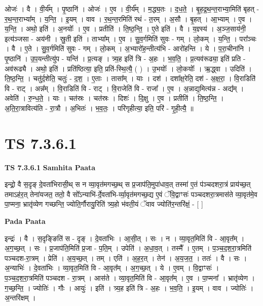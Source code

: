 \documentclass[17pt]{extarticle}
\begin{document}
ओजः॑ । वै । वी॒र्य᳚म् । पृ॒ष्ठानि॑ । ओजः॑ । ए॒व । वी॒र्य᳚म् । म॒द्ध्य॒तः । द॒ध॒ते॒ । बृ॒ह॒द्र॒थ॒न्त॒राभ्या॒मिति॑ बृहत् - र॒थ॒न्त॒राभ्या᳚म् । य॒न्ति॒ । इ॒यम् । वाव । र॒थ॒न्त॒रमिति॑ रथं - त॒रम् । अ॒सौ । बृ॒हत् । आ॒भ्याम् । ए॒व । य॒न्ति॒ । अथो॒ इति॑ । अ॒नयोः᳚ । ए॒व । प्रतीति॑ । ति॒ष्ठ॒न्ति॒ । ए॒ते इति॑ । वै । य॒ज्ञ्स्य॑ । अ॒ञ्ज॒साय॑नी॒ इत्य॑ञ्जसा - अय॑नी । स्रु॒ती इति॑ । ताभ्या᳚म् । ए॒व । सु॒व॒र्गमिति॑ सुवः - गम् । लो॒कम् । य॒न्ति॒ । परा᳚ञ्चः । वै । ए॒ते । सु॒व॒र्गमिति॑ सुवः - गम् । लो॒कम् । अ॒भ्यारो॑ह॒न्तीत्य॑भि - आरो॑हन्ति । ये । प॒रा॒चीना॑नि । पृ॒ष्ठानि॑ । उ॒प॒यन्तीत्यु॑प - यन्ति॑ । प्र॒त्यङ् । त्र्य॒ह इति॑ त्रि - अ॒हः । भ॒व॒ति॒ । प्र॒त्यव॑रूढ्या॒ इति॑ प्रति - अव॑रूढ्यै । अथो॒ इति॑ । प्रति॑ष्ठित्या॒ इति॒ प्रति॑-स्थि॒त्यै॒ ( ) । उ॒भयोः᳚ । लो॒कयोः᳚ । ऋ॒द्ध्वा । उदिति॑ । ति॒ष्ठ॒न्ति॒ । चतु॑र्द॒शेति॒ चतुः॑ - द॒श॒ । ए॒ताः । तासा᳚म् । याः । दश॑ । दशा᳚क्ष॒रेति॒ दश॑ - अ॒क्ष॒रा॒ । वि॒राडिति॑ वि - राट् । अन्न᳚म् । वि॒राडिति॑ वि - राट् । वि॒राजेति॑ वि - राजा᳚ । ए॒व । अ॒न्नाद्य॒मित्य॑न्न - अद्य᳚म् । अवेति॑ । रु॒न्ध॒ते॒ । याः । चत॑स्रः । चत॑स्रः । दिशः॑ । दि॒क्षु । ए॒व । प्रतीति॑ । ति॒ष्ठ॒न्ति॒ । अ॒ति॒रा॒त्रावित्य॑ति - रा॒त्रौ । अ॒भितः॑ । भ॒व॒तः॒ । परि॑गृहीत्या॒ इति॒ परि॑ - गृ॒ही॒त्यै॒ ॥  \newline




\section*{ TS 7.3.6.1 }

\textbf{TS 7.3.6.1 } \newline
\textbf{Samhita Paata} \newline

इन्द्रो॒ वै स॒दृङ् दे॒वता॑भिरासी॒थ् स न व्या॒वृत॑मगच्छ॒थ् स प्र॒जाप॑ति॒मुपा॑धाव॒त् तस्मा॑ ए॒तं प॑ञ्चदशरा॒त्रं प्राय॑च्छ॒त् तमाऽह॑र॒त् तेना॑यजत॒ ततो॒ वै सो᳚ऽन्याभि॑-र्दे॒वता॑भि-र्व्या॒वृत॑मगच्छ॒द्य ए॒वं ॅवि॒द्वाꣳसः॑ पञ्चदशरा॒त्रमास॑ते व्या॒वृत॑मे॒व पा॒प्मना॒ भ्रातृ॑व्येण गच्छन्ति॒ ज्योति॒र्गौरायु॒रिति॑ त्र्य॒हो भ॑वती॒यं ॅवाव ज्योति॑र॒न्तरि॑क्षं॒ - [  ] \newline

\textbf{Pada Paata} \newline

इन्द्रः॑ । वै । स॒दृङ्ङिति॑ स - दृङ् । दे॒वता॑भिः । आ॒सी॒त् । सः । न । व्या॒वृत॒मिति॑ वि - आ॒वृत᳚म् । अ॒ग॒च्छ॒त् । सः । प्र॒जाप॑ति॒मिति॑ प्र॒जा - प॒ति॒म् । उपेति॑ । अ॒धा॒व॒त् । तस्मै᳚ । ए॒तम् । प॒ञ्च॒द॒श॒रा॒त्रमिति॑ पञ्चदश-रा॒त्रम् । प्रेति॑ । अ॒य॒च्छ॒त् । तम् । एति॑ । अ॒ह॒र॒त् । तेन॑ । अ॒य॒ज॒त॒ । ततः॑ । वै । सः । अ॒न्याभिः॑ । दे॒वता॑भिः । व्या॒वृत॒मिति॑ वि - आ॒वृत᳚म् । अ॒ग॒च्छ॒त् । ये । ए॒वम् । वि॒द्वाꣳसः॑ । प॒ञ्च॒द॒श॒रा॒त्रमिति॑ पञ्चदश - रा॒त्रम् । आस॑ते । व्या॒वृत॒मिति॑ वि - आ॒वृत᳚म् । ए॒व । पा॒प्मना᳚ । भ्रातृ॑व्येण । ग॒च्छ॒न्ति॒ । ज्योतिः॑ । गौः । आयुः॑ । इति॑ । त्र्य॒ह इति॑ त्रि - अ॒हः । भ॒व॒ति॒ । इ॒यम् । वाव । ज्योतिः॑ । अ॒न्तरि॑क्षम् ।  \newline
\end{document}
